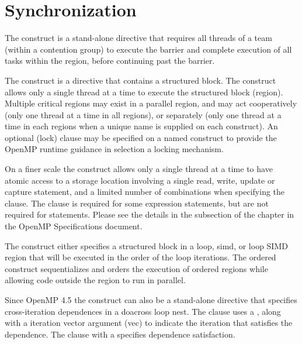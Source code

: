 \pagebreak
\chapter{Synchronization}
\label{chap:synchronization}

The  construct is a stand-alone directive that requires all threads
of a team (within a contention group) to execute the barrier and complete
execution of all tasks within the region, before continuing past the barrier.

The  construct is a directive that contains a structured block. 
The construct allows only a single thread at a time to execute the structured block (region).
Multiple critical regions may exist in a parallel region, and may
act cooperatively (only one thread at a time in all  regions),
or separately (only one thread at a time in each  regions when
a unique name is supplied on each  construct).
An optional (lock)  clause may be specified on a named  
construct to provide the OpenMP runtime guidance in selection a locking 
mechanism.

On a finer scale the  construct allows only a single thread at 
a time to have atomic access to a storage location involving a single read, 
write, update or capture statement, and a limited number of combinations 
when specifying the   clause.  The  clause
is required for some expression statements, but are not required for 
 statements. Please see the details in the  
subsection of the  chapter in the OpenMP Specifications document.

The  construct either specifies a structured block in a loop, 
simd, or loop SIMD region that will be executed in the order of the loop 
iterations.  The ordered construct sequentializes and orders the execution 
of ordered regions while allowing code outside the region to run in parallel.

Since OpenMP 4.5 the  construct can also be a stand-alone 
directive that specifies cross-iteration dependences in a doacross loop nest.  
The  clause uses a  , along with a 
iteration vector argument (vec) to indicate the iteration that satisfies the 
dependence.  The  clause with a 
 specifies dependence satisfaction.

